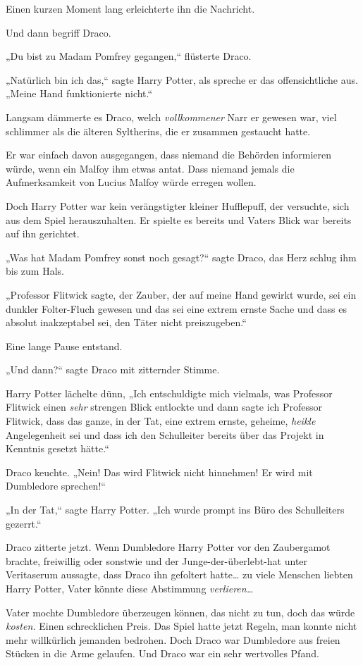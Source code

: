 {Einen kurzen Moment lang erleichterte ihn die Nachricht.

Und dann begriff Draco.

„Du bist zu Madam Pomfrey gegangen,“ flüsterte Draco.

„Natürlich bin ich das,“ sagte Harry Potter, als spreche er das offensichtliche aus. „Meine Hand funktionierte nicht.“

Langsam dämmerte es Draco, welch \emph{vollkommener} Narr er gewesen war, viel schlimmer als die älteren Syltherins, die er zusammen gestaucht hatte.

Er war einfach davon ausgegangen, dass niemand die Behörden informieren würde, wenn ein Malfoy ihm etwas antat. Dass niemand jemals die Aufmerksamkeit von Lucius Malfoy würde erregen wollen.

Doch Harry Potter war kein verängstigter kleiner Hufflepuff, der versuchte, sich aus dem Spiel herauszuhalten. Er spielte es bereits und Vaters Blick war bereits auf ihn gerichtet.

„Was hat Madam Pomfrey sonst noch gesagt?“ sagte Draco, das Herz schlug ihm bis zum Hals.

„Professor Flitwick sagte, der Zauber, der auf meine Hand gewirkt wurde, sei ein dunkler Folter-Fluch gewesen und das sei eine extrem ernste Sache und dass es absolut inakzeptabel sei, den Täter nicht preiszugeben.“

Eine lange Pause entstand.

„Und dann?“ sagte Draco mit zitternder Stimme.

Harry Potter lächelte dünn, „Ich entschuldigte mich vielmals, was Professor Flitwick einen \emph{sehr} strengen Blick entlockte und dann sagte ich Professor Flitwick, dass das ganze, in der Tat, eine extrem ernste, geheime, \emph{heikle} Angelegenheit sei und dass ich den Schulleiter bereits über das Projekt in Kenntnis gesetzt hätte.“

Draco keuchte. „Nein! Das wird Flitwick nicht hinnehmen! Er wird mit Dumbledore sprechen!“

„In der Tat,“ sagte Harry Potter. „Ich wurde prompt ins Büro des Schulleiters gezerrt.“

Draco zitterte jetzt. Wenn Dumbledore Harry Potter vor den Zaubergamot brachte, freiwillig oder sonstwie und der Junge-der-überlebt-hat unter Veritaserum aussagte, dass Draco ihn gefoltert hatte… zu viele Menschen liebten Harry Potter, Vater könnte diese Abstimmung \emph{verlieren…}

Vater mochte Dumbledore überzeugen können, das nicht zu tun, doch das würde \emph{kosten.} Einen schrecklichen Preis. Das Spiel hatte jetzt Regeln, man konnte nicht mehr willkürlich jemanden bedrohen. Doch Draco war Dumbledore aus freien Stücken in die Arme gelaufen. Und Draco war ein sehr wertvolles Pfand.

}
